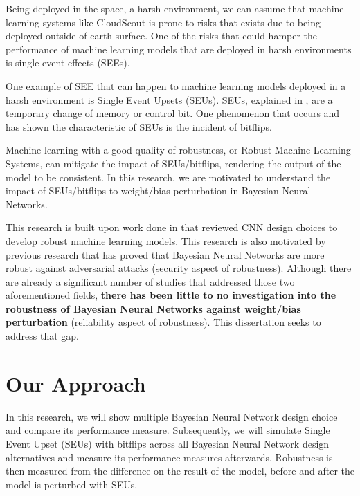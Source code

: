\documentclass[ %
                    author={Revalda Putawara},
                supervisor={Dr. James Pope},
                    degree={MSc},
                     title={Robustness of Bayesian Neural Networks Design Choices Against Weight and Bias Perturbation Induced by Single Event Upsets (SEUs)},
                      type={},
                      year={2025}]{dissertation}
\begin{document}
Being deployed in the space, a harsh environment, we can assume that machine learning systems like CloudScout is prone to risks that exists due to being deployed outside of earth surface. One of the risks that could hamper the performance of machine learning models that are deployed in harsh environments is single event effects (SEEs).

One example of SEE that can happen to machine learning models deployed in a harsh environment is Single Event Upsets (SEUs). SEUs, explained in \cite{petersen_single_2011}, are a temporary change of memory or control bit. One phenomenon that occurs and has shown the characteristic of SEUs is the incident of bitflips.

Machine learning with a good quality of robustness, or Robust Machine Learning Systems, can mitigate the impact of SEUs/bitflips, rendering the output of the model to be consistent. In this research, we are motivated to understand the impact of SEUs/bitflips to weight/bias perturbation in Bayesian Neural Networks. 

This research is built upon work done in \cite{dennispoperobustcnn} that reviewed CNN design choices to develop robust machine learning models. This research is also motivated by previous research that has proved that Bayesian Neural Networks are more robust against adversarial attacks (security aspect of robustness). Although there are already a significant number of studies that addressed those two aforementioned fields, \textbf{there has been little to no investigation into the robustness of Bayesian Neural Networks against weight/bias perturbation} (reliability aspect of robustness). This dissertation seeks to address that gap.


\section{Our Approach}

In this research, we will show multiple Bayesian Neural Network design choice and compare its performance measure. Subsequently, we will simulate Single Event Upset (SEUs) with bitflips across all Bayesian Neural Network design alternatives and measure its performance measures afterwards. Robustness is then measured from the difference on the result of the model, before and after the model is perturbed with SEUs.
\end{document}

